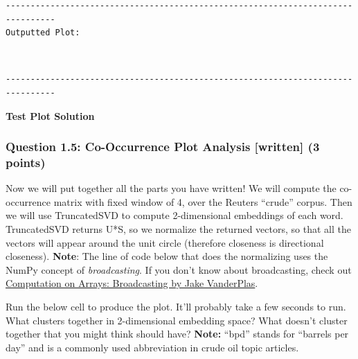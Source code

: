 \documentclass[11pt]{article}
\begin{document}
    \begin{Verbatim}[commandchars=\\\{\}]
--------------------------------------------------------------------------------
Outputted Plot:

    \end{Verbatim}

    \begin{center}
    \end{center}
    { \hspace*{\fill} \\}
    
    \begin{Verbatim}[commandchars=\\\{\}]
--------------------------------------------------------------------------------

    \end{Verbatim}

    \textbf{Test Plot Solution} 

    \hypertarget{question-1.5-co-occurrence-plot-analysis-written-3-points}{%
\subsubsection{Question 1.5: Co-Occurrence Plot Analysis {[}written{]}
(3
points)}\label{question-1.5-co-occurrence-plot-analysis-written-3-points}}

Now we will put together all the parts you have written! We will compute
the co-occurrence matrix with fixed window of 4, over the Reuters
``crude'' corpus. Then we will use TruncatedSVD to compute 2-dimensional
embeddings of each word. TruncatedSVD returns U*S, so we normalize the
returned vectors, so that all the vectors will appear around the unit
circle (therefore closeness is directional closeness). \textbf{Note}:
The line of code below that does the normalizing uses the NumPy concept
of \emph{broadcasting}. If you don't know about broadcasting, check out
\href{https://jakevdp.github.io/PythonDataScienceHandbook/02.05-computation-on-arrays-broadcasting.html}{Computation
on Arrays: Broadcasting by Jake VanderPlas}.

Run the below cell to produce the plot. It'll probably take a few
seconds to run. What clusters together in 2-dimensional embedding space?
What doesn't cluster together that you might think should have?
\textbf{Note:} ``bpd'' stands for ``barrels per day'' and is a commonly
used abbreviation in crude oil topic articles.
\end{document}
